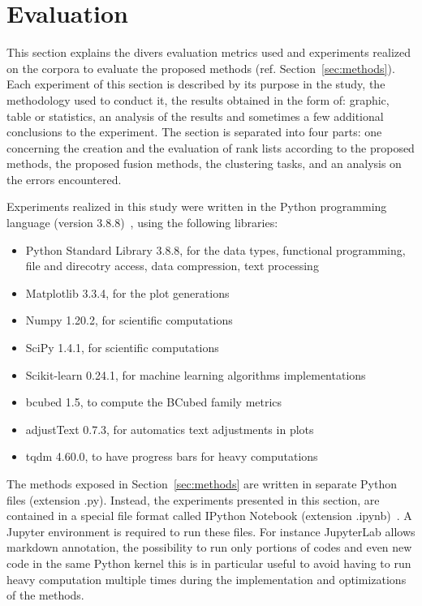 \section{Evaluation \label{sec:evaluation}}

This section explains the divers evaluation metrics used and experiments realized on the corpora to evaluate the proposed methods (ref. Section~\ref{sec:methods}).
Each experiment of this section is described by its purpose in the study, the methodology used to conduct it, the results obtained in the form of: graphic, table or statistics, an analysis of the results and sometimes a few additional conclusions to the experiment.
The section is separated into four parts: one concerning the creation and the evaluation of rank lists according to the proposed methods, the proposed fusion methods, the clustering tasks, and an analysis on the errors encountered.

Experiments realized in this study were written in the Python programming language (version 3.8.8)~\cite{python}, using the following libraries:
\begin{itemize}
  \item Python Standard Library 3.8.8, for the data types, functional programming, file and direcotry access, data compression, text processing~\cite{python_standard_library}
  \item Matplotlib 3.3.4, for the plot generations~\cite{matplotlib}
  \item Numpy 1.20.2, for scientific computations~\cite{numpy}
  \item SciPy 1.4.1, for scientific computations~\cite{scipy}
  \item Scikit-learn 0.24.1, for machine learning algorithms implementations~\cite{sklearn}
  \item bcubed 1.5, to compute the BCubed family metrics~\cite{bcubed_gh}
  \item adjustText 0.7.3, for automatics text adjustments in plots~\cite{adjustText}
  \item tqdm 4.60.0, to have progress bars for heavy computations~\cite{tqdm}
\end{itemize}
The methods exposed in Section~\ref{sec:methods} are written in separate Python files (extension .py).
Instead, the experiments presented in this section, are contained in a special file format called IPython Notebook (extension .ipynb)~\cite{jupyter}.
A Jupyter environment is required to run these files.
For instance JupyterLab allows markdown annotation, the possibility to run only portions of codes and even new code in the same Python kernel this is in particular useful to avoid having to run heavy computation multiple times during the implementation and optimizations of the methods.







